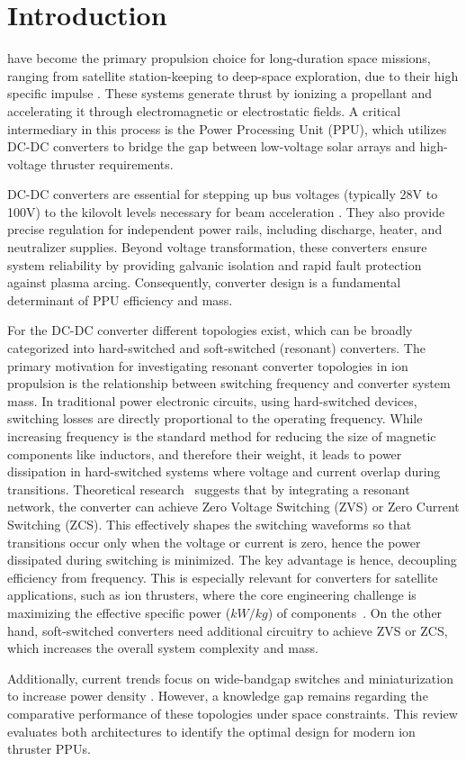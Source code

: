 \section{Introduction}
 have become the primary propulsion choice for long-duration space missions, ranging from satellite station-keeping to deep-space exploration, due to their high specific impulse \cite{Mazouffre2016}. These systems generate thrust by ionizing a propellant and accelerating it through electromagnetic or electrostatic fields. A critical intermediary in this process is the Power Processing Unit (PPU), which utilizes DC-DC converters to bridge the gap between low-voltage solar arrays and high-voltage thruster requirements.

DC-DC converters are essential for stepping up bus voltages (typically 28V to 100V) to the kilovolt levels necessary for beam acceleration \cite{Faircloth2026}. They also provide precise regulation for independent power rails, including discharge, heater, and neutralizer supplies. Beyond voltage transformation, these converters ensure system reliability by providing galvanic isolation and rapid fault protection against plasma arcing. Consequently, converter design is a fundamental determinant of PPU efficiency and mass.




For the DC-DC converter different topologies exist, which can be broadly categorized into hard-switched and soft-switched (resonant) converters. 
The primary motivation for investigating resonant converter topologies in ion propulsion is the relationship between switching frequency and converter system mass. In traditional power electronic circuits, using hard-switched devices, switching losses are directly proportional to the operating frequency. While increasing frequency is the standard method for reducing the size of magnetic components like inductors, and therefore their weight, it leads to power dissipation in hard-switched systems where voltage and current overlap during transitions. Theoretical research~\cite{bellar1998review} suggests that by integrating a resonant network, the converter can achieve Zero Voltage Switching (ZVS) or Zero Current Switching (ZCS). This effectively shapes the switching waveforms so that transitions occur only when the voltage or current is zero, hence the power dissipated during switching is minimized. The key advantage is hence, decoupling efficiency from frequency. This is especially relevant for converters for satellite applications, such as ion thrusters, where the core engineering challenge is maximizing the effective specific power ($kW/kg$) of components~\cite{gao2017soft}. On the other hand, soft-switched converters need additional circuitry to achieve ZVS or ZCS, which increases the overall system complexity and mass. 

Additionally, current trends focus on wide-bandgap switches and miniaturization to increase power density \cite{Comparini2012}. However, a knowledge gap remains regarding the comparative performance of these topologies under space constraints. This review evaluates both architectures to identify the optimal design for modern ion thruster PPUs.